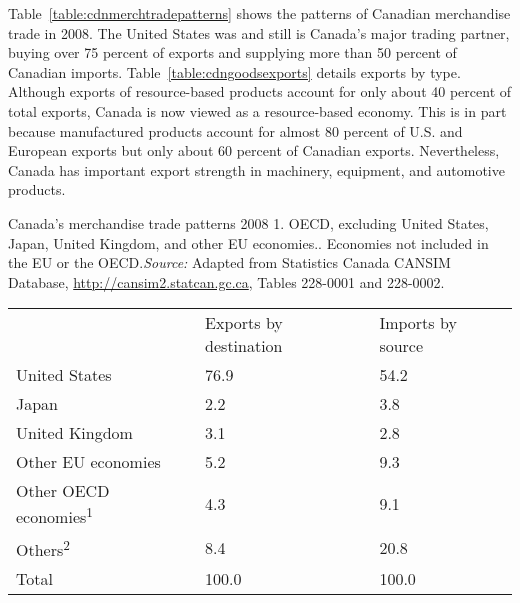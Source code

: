 Table~\ref{table:cdnmerchtradepatterns} shows the patterns of Canadian merchandise trade in 2008. The United States was and still is Canada's major trading partner, buying over 75 percent of exports and supplying more than 50 percent of Canadian imports. Table~\ref{table:cdngoodsexports} details exports by type. Although exports of resource-based products account for only about 40 percent of total exports, Canada is now viewed as a resource-based economy. This is in part because manufactured products account for almost 80 percent of U.S. and European exports but only about 60 percent of Canadian exports. Nevertheless, Canada has important export strength in machinery, equipment, and automotive products.

\begin{Table}{25em}{Canada's merchandise trade patterns 2008 \label{table:cdnmerchtradepatterns}}{1. OECD, excluding United States, Japan, United Kingdom, and other EU economies.. Economies not included in the EU or the OECD.\newline \textit{Source:} Adapted from Statistics Canada CANSIM Database, \url{http://cansim2.statcan.gc.ca}, Tables 228-0001 and 228-0002.}
\begin{tabu} to \linewidth {|X[1.75,l]X[1,c]X[1,c]|}	\hline
{}										&	Exports by destination	&	Imports by source	\\
					United States							&	76.9					&	54.2				\\
Japan									&	2.2						&	3.8					\\
					United Kingdom							&	3.1						&	2.8					\\
Other EU economies						&	5.2						&	9.3					\\
					Other OECD economies\textsuperscript{1}	&	4.3						&	9.1					\\
Others\textsuperscript{2}				&	8.4						&	20.8				\\
					Total									&	100.0					&	100.0				\\	\hline
\end{tabu}
\end{Table}

